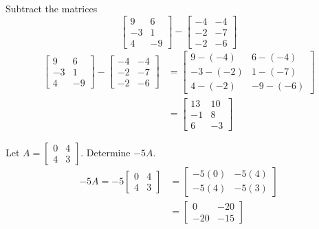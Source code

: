 \documentclass[letterpaper,12pt]{article}
\begin{document}
\begin{example}
Subtract the matrices
\begin{equation*}
    \begin{bmatrix} 9 & 6 \\ -3 & 1 \\ 4 & -9 \end{bmatrix} - \begin{bmatrix} -4 & -4 \\ -2 & -7 \\ -2 & -6 \end{bmatrix}
\end{equation*}
\begin{align*}
    \begin{bmatrix} 9 & 6 \\ -3 & 1 \\ 4 & -9 \end{bmatrix} - \begin{bmatrix} -4 & -4 \\ -2 & -7 \\ -2 & -6 \end{bmatrix} & = \begin{bmatrix} 9 - (-4) & 6 - (-4) \\ -3 - (-2) & 1 - (-7) \\ 4 - (-2) & -9 - (-6) \end{bmatrix} \\
    & = \begin{bmatrix} 13 & 10 \\ -1 & 8 \\ 6 & -3 \end{bmatrix}
\end{align*}
\end{example}

\begin{example}
Let $A = \begin{bmatrix} 0 & 4 \\ 4 & 3 \end{bmatrix}$. Determine $-5A$.
\begin{align*}
    -5A = -5 \begin{bmatrix} 0 & 4 \\ 4 & 3 \end{bmatrix} & = \begin{bmatrix} -5(0) & -5(4) \\ -5(4) & -5(3) \end{bmatrix} \\
    & = \begin{bmatrix} 0 & -20 \\ -20 & -15 \end{bmatrix}
\end{align*}
\end{example}
\end{document}
